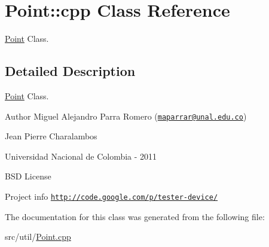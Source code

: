 \hypertarget{class_point_1_1cpp}{
\section{Point::cpp Class Reference}
\label{class_point_1_1cpp}
}


\hyperlink{class_point}{Point} Class.  




\subsection{Detailed Description}
\hyperlink{class_point}{Point} Class. \begin{DoxyAuthor}{Author}
Miguel Alejandro Parra Romero (\href{mailto:maparrar@unal.edu.co}{\tt maparrar@unal.edu.co}) 

Jean Pierre Charalambos 

Universidad Nacional de Colombia -\/ 2011
\end{DoxyAuthor}
BSD License

Project info \href{http://code.google.com/p/tester-device/}{\tt http://code.google.com/p/tester-\/device/} 

The documentation for this class was generated from the following file:\begin{DoxyCompactItemize}
\item 
src/util/\hyperlink{_point_8cpp}{Point.cpp}\end{DoxyCompactItemize}
